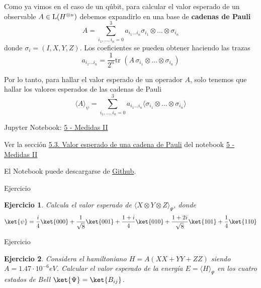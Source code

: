 \documentclass[a4paper,11pt]{book} %
\newtheorem{ejercicio_contador}{Ejercicio}
\newcommand{\Ejercicio}[1]{
		\begin{mybox_gray}{Ejercicio} 
			\begin{ejercicio_contador}
				 #1 
			\end{ejercicio_contador} 
		\end{mybox_gray}
	}
\numberwithin{equation}{chapter}
\begin{document}
Como ya vimos en el caso de un qúbit, para calcular el valor esperado de un observable $A\in {\rm L}(H^{\otimes n})$ debemos expandirlo en una base de \textbf{cadenas de Pauli}
	\begin{equation} \label{ec_medidas2_A_en_cadenas_de_Pauli}
	A = \sum_{i_1,...,i_n=0}^3 a_{i_1\ldots i_n} \sigma_{i_1}\otimes \ldots \otimes \sigma_{i_n}
	\end{equation}
donde $\sigma_i = (I,X,Y,Z)$. Los coeficientes se pueden obtener haciendo las trazas
	\begin{equation} \label{ec_medidas2_coef_A_en_cadenas_de_Pauli}
	a_{i_1\ldots i_n} =\frac{1}{2^n} \text{tr } (A \,  \sigma_{i_1}\otimes \ldots  \otimes\sigma_{i_n})
	\end{equation}

Por lo tanto, para hallar el valor esperado de un operador $A$, solo tenemos que hallar los valores esperados de las cadenas de Pauli
	\begin{equation}
	\langle A \rangle_{\psi} =  \sum_{i_1,...,i_n=0}^3 a_{i_1\ldots i_n} \langle \sigma_{i_1}\otimes \ldots   \otimes\sigma_{i_n}\rangle
	\end{equation}

	\begin{mybox_orange}{Jupyter Notebook: \href{https://www.scbi.uma.es/web/wp-content/uploads/Jupyterbook/CICC_UMA/Notebooks/html/docs/Part_01/Chapter_05-Medidas_II_myst.html}{5 - Medidas II}}

	Ver la sección \href{https://www.scbi.uma.es/web/wp-content/uploads/Jupyterbook/CICC_UMA/Notebooks/html/docs/Part_01/Chapter_05-Medidas_II_myst.html#valor-esperado-de-una-cadena-de-pauli}{5.3. Valor esperado de una cadena de Pauli} del notebook \href{https://www.scbi.uma.es/web/wp-content/uploads/Jupyterbook/CICC_UMA/Notebooks/html/docs/Part_01/Chapter_05-Medidas_II_myst.html}{5 - Medidas II}
	
	El Notebook puede descargarse de \href{https://github.com/davidcb98/CICC_UMA/blob/master/Notebooks/Part_01/Chapter_05-Medidas_II.ipynb}{Github}.
	\end{mybox_orange}


	\Ejercicio{
	Calcula el valor esperado de $\langle X\otimes Y\otimes Z\rangle_\Psi$, donde 
	\begin{equation}
	\ket{\psi} = \frac{i}{4} \ket{000}+\frac{1}{\sqrt{8}} \ket{001}+\frac{1+i}{4} \ket{010}+
	\frac{1+2i}{\sqrt{8}}\ket{101}+\frac{1}{4} \ket{110}
	\end{equation}   
	}
	
	\Ejercicio{
	Considera el hamiltoniano $H=A(X X+Y Y+Z Z)$ siendo $A=1.47\cdot 10^{-6}eV$. Calcular el 
	valor esperado de la energía $E = \langle H\rangle_\Psi$  en los cuatro estados de Bell 
	$\ket{\Psi} = \ket{B_{ij}}$. 
	}
\end{document}
